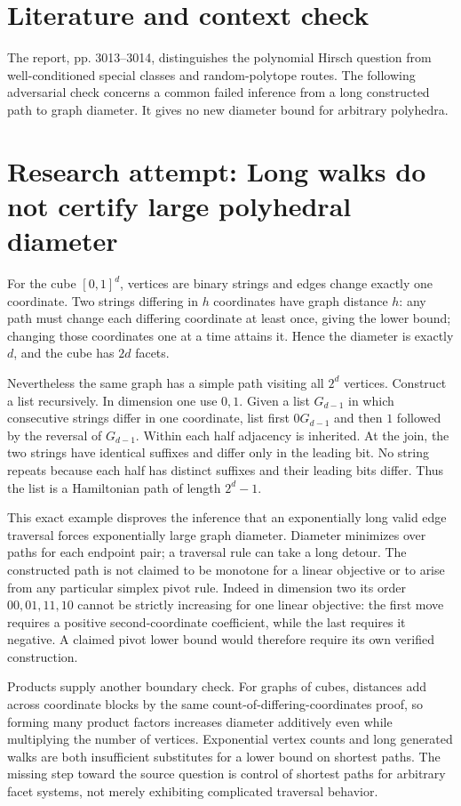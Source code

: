 \documentclass[11pt]{article}
\begin{document}
\section{Literature and context check}
The report, pp. 3013--3014, distinguishes the polynomial Hirsch question from well-conditioned special classes and random-polytope routes. The following adversarial check concerns a common failed inference from a long constructed path to graph diameter. It gives no new diameter bound for arbitrary polyhedra.
\section{Research attempt: Long walks do not certify large polyhedral diameter}
For the cube $[0,1]^d$, vertices are binary strings and edges change exactly one coordinate. Two strings differing in $h$ coordinates have graph distance $h$: any path must change each differing coordinate at least once, giving the lower bound; changing those coordinates one at a time attains it. Hence the diameter is exactly $d$, and the cube has $2d$ facets.

Nevertheless the same graph has a simple path visiting all $2^d$ vertices. Construct a list recursively. In dimension one use $0,1$. Given a list $G_{d-1}$ in which consecutive strings differ in one coordinate, list first $0G_{d-1}$ and then $1$ followed by the reversal of $G_{d-1}$. Within each half adjacency is inherited. At the join, the two strings have identical suffixes and differ only in the leading bit. No string repeats because each half has distinct suffixes and their leading bits differ. Thus the list is a Hamiltonian path of length $2^d-1$.

This exact example disproves the inference that an exponentially long valid edge traversal forces exponentially large graph diameter. Diameter minimizes over paths for each endpoint pair; a traversal rule can take a long detour. The constructed path is not claimed to be monotone for a linear objective or to arise from any particular simplex pivot rule. Indeed in dimension two its order $00,01,11,10$ cannot be strictly increasing for one linear objective: the first move requires a positive second-coordinate coefficient, while the last requires it negative. A claimed pivot lower bound would therefore require its own verified construction.

Products supply another boundary check. For graphs of cubes, distances add across coordinate blocks by the same count-of-differing-coordinates proof, so forming many product factors increases diameter additively even while multiplying the number of vertices. Exponential vertex counts and long generated walks are both insufficient substitutes for a lower bound on shortest paths. The missing step toward the source question is control of shortest paths for arbitrary facet systems, not merely exhibiting complicated traversal behavior.
\end{document}
